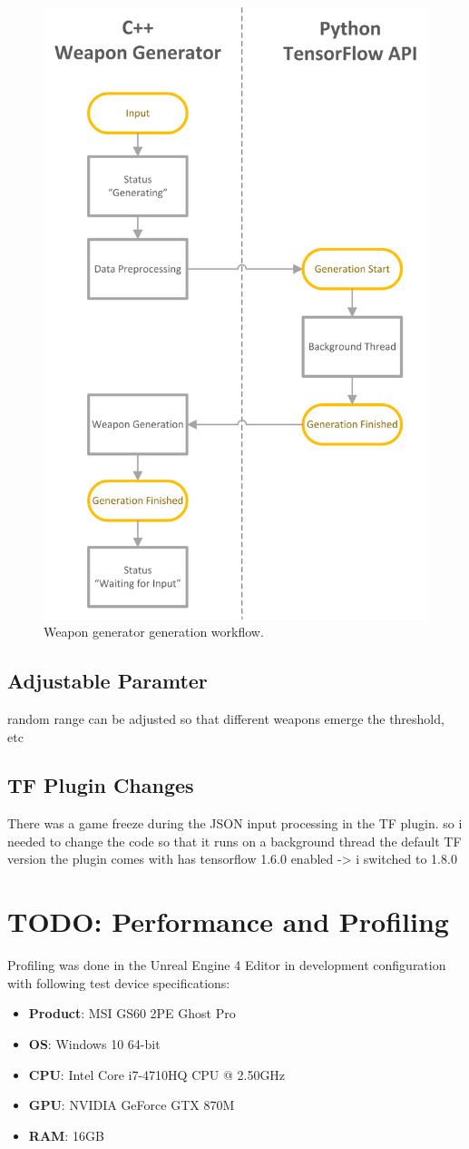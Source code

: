 \documentclass[MGS,Master,english]{twbook}%
\begin{document}
\begin{figure}[!htbp]
	\centering
	\includegraphics[width=0.5\linewidth]{PICs/WeaponGeneratorWorkflow_Generation}
	\caption{Weapon generator generation workflow.}
\end{figure}


\subsection{Adjustable Paramter}
random range can be adjusted so that different weapons emerge
the threshold, etc

\subsection{\ac{TF} Plugin Changes}
There was a game freeze during the JSON input processing in the TF plugin. so i needed to change the code so that it runs on a background thread
the default TF version the plugin comes with has tensorflow 1.6.0 enabled -> i switched to 1.8.0


\section{TODO: Performance and Profiling}
Profiling was done in the Unreal Engine 4 Editor in development configuration with following test device specifications:
\begin{itemize}
	\item \textbf{Product}: MSI GS60 2PE Ghost Pro
	\item \textbf{OS}: Windows 10 64-bit
	\item \textbf{CPU}: Intel Core i7-4710HQ CPU @ 2.50GHz
	\item \textbf{GPU}: NVIDIA GeForce GTX 870M
	\item \textbf{\ac{RAM}}: 16GB
\end{itemize}
\end{document}
